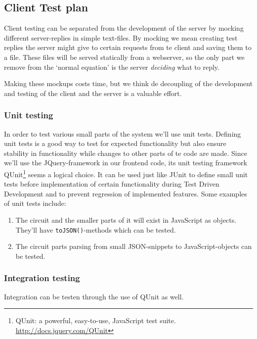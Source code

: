 \subsection{Client Test plan}
Client testing can be separated from the development of the server by mocking different server-replies in simple text-files. By mocking we mean creating test replies the server might give to certain requests from te client and saving them to a file. These files will be served statically from a webserver, so the only part we remove from the `normal equation' is the server \textit{deciding} what to reply.

Making these mockups costs time, but we think de decoupling of the development and testing of the client and the server is a valuable effort.

\subsubsection{Unit testing}
In order to test various small parts of the system we'll use unit tests. Defining unit tests is a good way to test for expected functionality but also ensure stability in functionality while changes to other parts of te code are made. Since we'll use the JQuery-framework in our frontend code, its unit testing framework QUnit\footnote{QUnit: a powerful, easy-to-use, JavaScript test suite. \url{http://docs.jquery.com/QUnit}} seems a logical choice. It can be used just like JUnit to define small unit tests before implementation of certain functionality during Test Driven Development and to prevent regression of implemented features. Some examples of unit tests include:
\begin{enumerate}
	\item The circuit and the smaller parts of it will exist in JavaScript as objects. They'll have \verb|toJSON()|-methods which can be tested.
	\item The circuit parts parsing from small JSON-snippets to JavaScript-objects can be tested.
\end{enumerate}

\subsubsection{Integration testing}
Integration can be testen through the use of QUnit as well.

